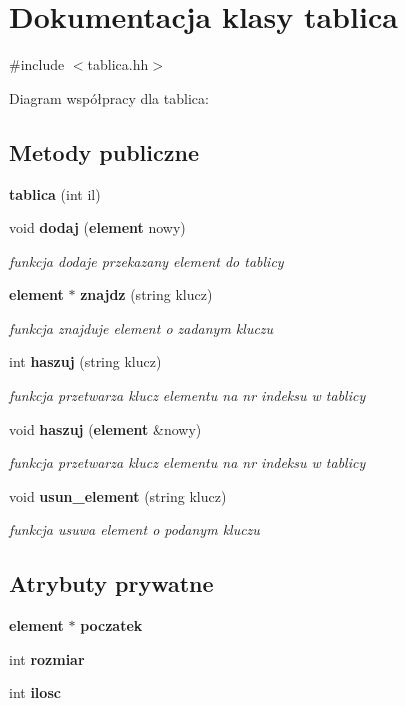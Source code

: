 \section{\-Dokumentacja klasy tablica}
\label{classtablica}


{\ttfamily \#include $<$tablica.\-hh$>$}



\-Diagram współpracy dla tablica\-:
\subsection*{\-Metody publiczne}
\begin{DoxyCompactItemize}
\item 
{\bf tablica} (int il)
\item 
void {\bf dodaj} ({\bf element} nowy)
\begin{DoxyCompactList}\small\item\em funkcja dodaje przekazany element do tablicy \end{DoxyCompactList}\item 
{\bf element} $\ast$ {\bf znajdz} (string klucz)
\begin{DoxyCompactList}\small\item\em funkcja znajduje element o zadanym kluczu \end{DoxyCompactList}\item 
int {\bf haszuj} (string klucz)
\begin{DoxyCompactList}\small\item\em funkcja przetwarza klucz elementu na nr indeksu w tablicy \end{DoxyCompactList}\item 
void {\bf haszuj} ({\bf element} \&nowy)
\begin{DoxyCompactList}\small\item\em funkcja przetwarza klucz elementu na nr indeksu w tablicy \end{DoxyCompactList}\item 
void {\bf usun\-\_\-element} (string klucz)
\begin{DoxyCompactList}\small\item\em funkcja usuwa element o podanym kluczu \end{DoxyCompactList}\end{DoxyCompactItemize}
\subsection*{\-Atrybuty prywatne}
\begin{DoxyCompactItemize}
\item 
{\bf element} $\ast$ {\bf poczatek}
\item 
int {\bf rozmiar}
\item 
int {\bf ilosc}
\end{DoxyCompactItemize}

